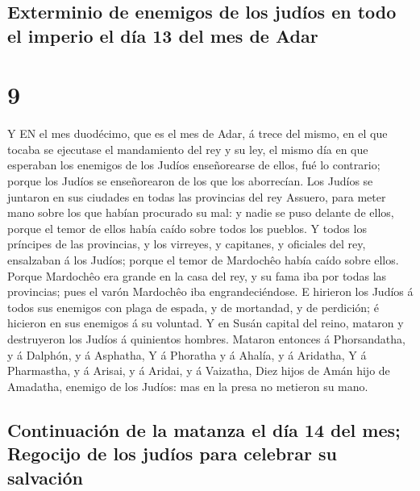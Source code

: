 \hypertarget{exterminio-de-enemigos-de-los-juduxedos-en-todo-el-imperio-el-duxeda-13-del-mes-de-adar}{%
\subsection{Exterminio de enemigos de los judíos en todo el imperio el
día 13 del mes de
Adar}\label{exterminio-de-enemigos-de-los-juduxedos-en-todo-el-imperio-el-duxeda-13-del-mes-de-adar}}

\hypertarget{section-8}{%
\section{9}\label{section-8}}

 Y EN el mes duodécimo, que es el mes de Adar, á trece del
mismo, en el que tocaba se ejecutase el mandamiento del rey y su ley, el
mismo día en que esperaban los enemigos de los Judíos enseñorearse de
ellos, fué lo contrario; porque los Judíos se enseñorearon de los que
los aborrecían.  Los Judíos se juntaron en sus ciudades en
todas las provincias del rey Assuero, para meter mano sobre los que
habían procurado su mal: y nadie se puso delante de ellos, porque el
temor de ellos había caído sobre todos los pueblos.  Y todos
los príncipes de las provincias, y los virreyes, y capitanes, y
oficiales del rey, ensalzaban á los Judíos; porque el temor de Mardochêo
había caído sobre ellos.  Porque Mardochêo era grande en la
casa del rey, y su fama iba por todas las provincias; pues el varón
Mardochêo iba engrandeciéndose.  E hirieron los Judíos á
todos sus enemigos con plaga de espada, y de mortandad, y de perdición;
é hicieron en sus enemigos á su voluntad.  Y en Susán
capital del reino, mataron y destruyeron los Judíos á quinientos
hombres.  Mataron entonces á Phorsandatha, y á Dalphón, y á
Asphatha,  Y á Phoratha y á Ahalía, y á Aridatha,
 Y á Pharmastha, y á Arisai, y á Aridai, y á Vaizatha,
 Diez hijos de Amán hijo de Amadatha, enemigo de los
Judíos: mas en la presa no metieron su mano.

\hypertarget{continuaciuxf3n-de-la-matanza-el-duxeda-14-del-mes-regocijo-de-los-juduxedos-para-celebrar-su-salvaciuxf3n}{%
\subsection{Continuación de la matanza el día 14 del mes; Regocijo de
los judíos para celebrar su
salvación}\label{continuaciuxf3n-de-la-matanza-el-duxeda-14-del-mes-regocijo-de-los-juduxedos-para-celebrar-su-salvaciuxf3n}}

